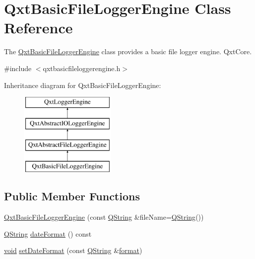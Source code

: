 \hypertarget{class_qxt_basic_file_logger_engine}{\section{Qxt\-Basic\-File\-Logger\-Engine Class Reference}
\label{class_qxt_basic_file_logger_engine}
}


The \hyperlink{class_qxt_basic_file_logger_engine}{Qxt\-Basic\-File\-Logger\-Engine} class provides a basic file logger engine.  Qxt\-Core.  




{\ttfamily \#include $<$qxtbasicfileloggerengine.\-h$>$}

Inheritance diagram for Qxt\-Basic\-File\-Logger\-Engine\-:\begin{figure}[H]
\begin{center}
\leavevmode
\includegraphics[height=4.000000cm]{class_qxt_basic_file_logger_engine}
\end{center}
\end{figure}
\subsection*{Public Member Functions}
\begin{DoxyCompactItemize}
\item 
\hyperlink{class_qxt_basic_file_logger_engine_ab9b7d0e5e2ee6ed0522e79dfa7933655}{Qxt\-Basic\-File\-Logger\-Engine} (const \hyperlink{group___u_a_v_objects_plugin_gab9d252f49c333c94a72f97ce3105a32d}{Q\-String} \&file\-Name=\hyperlink{group___u_a_v_objects_plugin_gab9d252f49c333c94a72f97ce3105a32d}{Q\-String}())
\item 
\hyperlink{group___u_a_v_objects_plugin_gab9d252f49c333c94a72f97ce3105a32d}{Q\-String} \hyperlink{class_qxt_basic_file_logger_engine_a638bdfc4405f04095e5f79f53de7a911}{date\-Format} () const 
\item 
\hyperlink{group___u_a_v_objects_plugin_ga444cf2ff3f0ecbe028adce838d373f5c}{void} \hyperlink{class_qxt_basic_file_logger_engine_a0b7557cd5ab8f15e107b7ce0ddba7154}{set\-Date\-Format} (const \hyperlink{group___u_a_v_objects_plugin_gab9d252f49c333c94a72f97ce3105a32d}{Q\-String} \&\hyperlink{glext_8h_a86f086d889f7cdb4d6461497ae891265}{format})
\end{DoxyCompactItemize}
